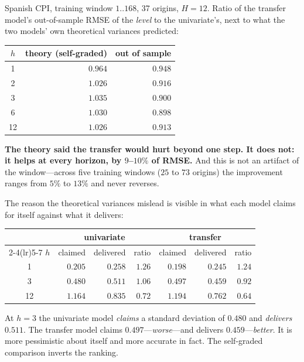 \documentclass[11pt,a4paper]{article}
\theoremstyle{plain}
\theoremstyle{remark}
\begin{document}
Spanish CPI, training window $1..168$, 37 origins, $H=12$. Ratio of the transfer
model's out-of-sample RMSE of the \emph{level} to the univariate's, next to what
the two models' own theoretical variances predicted:

\begin{center}
\begin{tabular}{crr}
\toprule
$h$ & theory (self-graded) & \textbf{out of sample} \\
\midrule
 1 & $0.964$ & $\mathbf{0.948}$ \\
 2 & $1.026$ & $\mathbf{0.916}$ \\
 3 & $1.035$ & $\mathbf{0.900}$ \\
 6 & $1.030$ & $\mathbf{0.898}$ \\
12 & $1.026$ & $\mathbf{0.913}$ \\
\bottomrule
\end{tabular}
\end{center}

\textbf{The theory said the transfer would hurt beyond one step. It does not: it
helps at every horizon, by $9$--$10\%$ of RMSE.} And this is not an artifact of the
window---across five training windows ($25$ to $73$ origins) the improvement ranges
from $5\%$ to $13\%$ and never reverses.

The reason the theoretical variances mislead is visible in what each model claims
for itself against what it delivers:

\begin{center}
\begin{tabular}{crrrrrr}
\toprule
 & \multicolumn{3}{c}{univariate} & \multicolumn{3}{c}{transfer}\\
\cmidrule(lr){2-4}\cmidrule(lr){5-7}
$h$ & claimed & delivered & ratio & claimed & delivered & ratio\\
\midrule
 1 & $0.205$ & $0.258$ & $1.26$ & $0.198$ & $0.245$ & $1.24$\\
 3 & $0.480$ & $0.511$ & $1.06$ & $0.497$ & $0.459$ & $\mathbf{0.92}$\\
12 & $1.164$ & $0.835$ & $0.72$ & $1.194$ & $0.762$ & $\mathbf{0.64}$\\
\bottomrule
\end{tabular}
\end{center}

At $h=3$ the univariate model \emph{claims} a standard deviation of $0.480$ and
\emph{delivers} $0.511$. The transfer model claims $0.497$---\emph{worse}---and
delivers $0.459$---\emph{better}. It is more pessimistic about itself and more
accurate in fact. The self-graded comparison inverts the ranking.
\end{document}
